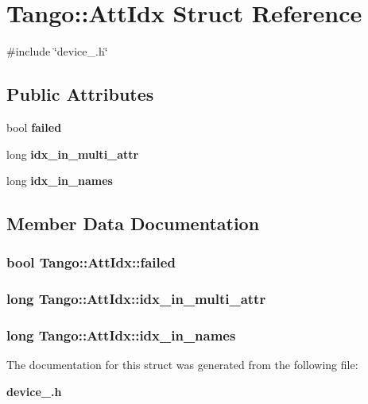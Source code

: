 \section{Tango\-:\-:Att\-Idx Struct Reference}
\label{structTango_1_1AttIdx}


{\ttfamily \#include \char`\"{}device\-\_.\-h\char`\"{}}

\subsection*{Public Attributes}
\begin{DoxyCompactItemize}
\item 
bool {\bf failed}
\item 
long {\bf idx\-\_\-in\-\_\-multi\-\_\-attr}
\item 
long {\bf idx\-\_\-in\-\_\-names}
\end{DoxyCompactItemize}


\subsection{Member Data Documentation}
\subsubsection[{failed}]{\setlength{\rightskip}{0pt plus 5cm}bool Tango\-::\-Att\-Idx\-::failed}\label{structTango_1_1AttIdx_ac0bbd831200c802daaad0c584cc81f0b}
\subsubsection[{idx\-\_\-in\-\_\-multi\-\_\-attr}]{\setlength{\rightskip}{0pt plus 5cm}long Tango\-::\-Att\-Idx\-::idx\-\_\-in\-\_\-multi\-\_\-attr}\label{structTango_1_1AttIdx_adea7a0153553f99a39be55f22c5d42c0}
\subsubsection[{idx\-\_\-in\-\_\-names}]{\setlength{\rightskip}{0pt plus 5cm}long Tango\-::\-Att\-Idx\-::idx\-\_\-in\-\_\-names}\label{structTango_1_1AttIdx_aa71a9486541800c6fae590d925c4e9fa}


The documentation for this struct was generated from the following file\-:\begin{DoxyCompactItemize}
\item 
{\bf device\-\_.\-h}\end{DoxyCompactItemize}
